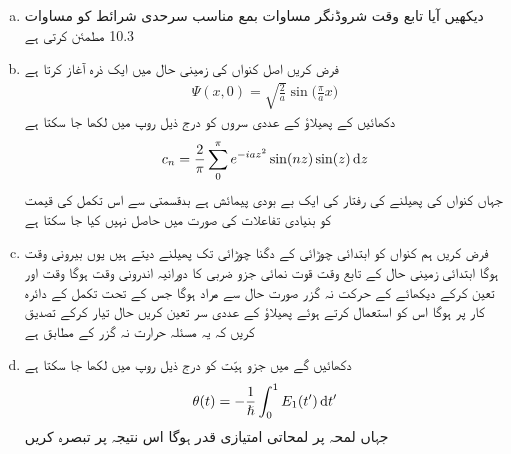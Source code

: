 \begin{enumerate}[a.]
\item
دیکھیں آیا تابع وقت شروڈنگر مساوات بمع مناسب سرحدی شرائط کو مساوات 10.3  مطمئن کرتی ہے 
\item
فرض کریں اصل کنواں کی زمینی حال میں ایک ذرہ آغاز   کرتا ہے  
\begin{align*}
\Psi (x, 0) = \sqrt{\frac{2}{a}} \sin \big ( \frac{\pi}{a} x \big )
\end{align*}
دکھائیں کے پھیلاؤ کے عددى سروں کو درج ذیل روپ میں لکھا جا سکتا ہے 
\begin{align}
c_n = \frac{2}{\pi} \sum_0^{\pi} e^{-iaz^2} \sin(nz) \sin(z) \dif z
\end{align}
جہاں 
کنواں کی پھیلنے کی رفتار کی ایک بے بودی پیمائش ہے بدقسمتی سے اس تکمل کی قیمت کو بنیادی تفاعلات کی صورت میں حاصل نہیں کیا جا سکتا ہے 
\item
فرض کریں ہم کنواں کو ابتدائی چوڑائی کے دگنا چوڑائی تک پھیلنے دیتے ہیں یوں بیرونی وقت  ہوگا ابتدائی زمینی حال کے تابع وقت قوت نمائی جزو ضربی کا دورانیہ اندرونی وقت ہوگا وقت  اور  تعین کرکے دیکھائے کے حرکت نہ گزر صورت حال سے مراد  ہوگا جس کے تحت تکمل کے دائرہ کار پر  ہوگا اس کو استعمال کرتے ہوئے پھیلاؤ کے عددی سر  تعین کریں حال  تیار کرکے تصدیق کریں کہ یہ مسئلہ حرارت نہ گزر کے مطابق ہے 
\item
دکھائیں گے  میں جزو ہيّت کو درج ذیل روپ میں لکھا جا سکتا ہے 
\begin{align}
\theta (t) = - \frac{1}{\hslash} \int_0^1 E_1 (t') \dif t'
\end{align}
جہاں لمحہ  پر لمحاتی امتیازی قدر  ہوگا اس نتیجہ پر تبصرہ کریں 
\end{enumerate}

